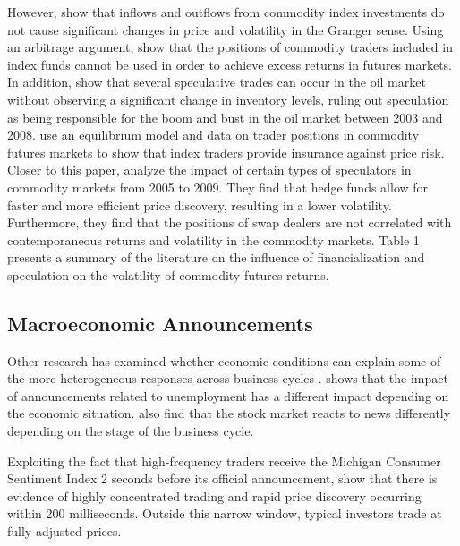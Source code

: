 \documentclass[12pt]{article}
\begin{document}
However, \citet{stoll2010commodity}  show that inflows and outflows from commodity index investments do not cause significant changes in price and volatility in the Granger sense. Using an arbitrage argument, \citet{hamilton2014risk} show that the positions of commodity traders included in index funds cannot be used in order to achieve excess returns in  futures markets. In addition, \citet{kilian2014role}  show that several speculative trades can occur in the oil market without observing a significant change in inventory levels, ruling out speculation as being responsible for the boom and bust in the oil market between 2003 and 2008.  \citet{brunetti2014commodity}  use an equilibrium model and data on trader positions in commodity futures markets to show that index traders provide insurance against price risk.   Closer to this paper,\citet{brunetti2016speculators}  analyze the impact of certain types of speculators in commodity markets from 2005 to 2009. They find that hedge funds allow for faster and more efficient price discovery, resulting in a lower volatility. Furthermore, they find that the positions of swap dealers are not correlated with contemporaneous returns and volatility in the commodity markets.  Table 1 presents a summary of the literature on the influence of financialization and speculation on the volatility of commodity futures returns.

\subsection{Macroeconomic Announcements}

Other research has examined whether economic conditions can explain some of the more heterogeneous responses across business cycles \citep{boyd2005stock,andersen2003micro}. \citet{boyd2005stock} shows that the impact of announcements related to unemployment has a different impact depending on the economic situation. \citet{andersen2003micro} also find that the stock market reacts to news differently depending on the stage of the business cycle.

Exploiting the fact that high-frequency traders receive the Michigan Consumer Sentiment Index 2 seconds before its official announcement, \citet{hu2017early} show that there is evidence of highly concentrated trading and rapid price discovery occurring within 200 milliseconds. Outside this narrow window, typical investors trade at fully adjusted prices. 
\end{document}
